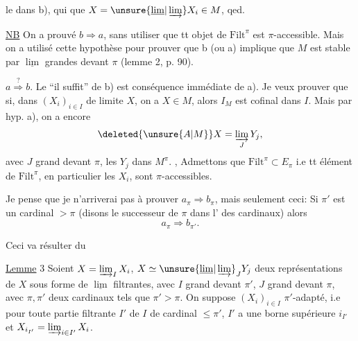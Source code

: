 le  dans b), qui   que $X=\unsure{\underline{\lim}|\varinjlim}X_i\in M$, qed.

\uline{NB} On a prouvé $b\Rightarrow a$, sans utiliser  que tt objet de $\mathrm{Filt}^{\pi}$ est $\pi$-accessible. Mais on a utilisé cette hypothèse pour prouver que b  (ou a) implique que $M$ est stable par $\underline{\lim}$ grandes devant $\pi$ (lemme 2, p. 90).

$a\overset{?}{\Longrightarrow}b$. Le ``il suffit'' de b) est conséquence immédiate de a). Je veux prouver que si, dans     $(X_i)_{i\in I}$ de limite $X$, on a $X\in M$, alors $I_M$ est cofinal dans $I$. Mais par hyp. a), on a encore
\[
\deleted{\unsure{A|M}}X=\varinjlim_JY_j,
\]
avec $J$ grand devant $\pi$, les $Y_j$ dans $M^{\pi}$. , Admettons que $\mathrm{Filt}^{\pi}\subset E_\pi$ i.e tt élément de $\mathrm{Filt}^{\pi}$, en particulier les $X_i$, sont  $\pi$-accessibles.

Je pense que je n'arriverai pas à prouver $a_\pi\Rightarrow b_\pi$, mais seulement ceci: Si $\pi'$ est un cardinal $>\pi$ (disons le successeur de $\pi$  dans l'  des cardinaux) alors
\[
a_\pi\Longrightarrow b_{\pi'}.
\]

Ceci va résulter du

\uline{Lemme} 3 Soient $X=\varinjlim_I X_i$, $X\simeq\unsure{\underline{\lim}|\varinjlim}_JY_j$ deux représentations de $X$ sous forme de $\underline{\lim}$ filtrantes, avec $I$ grand devant $\pi'$, $J$ grand devant $\pi$, avec $\pi,\pi'$ deux cardinaux tels que $\pi'>\pi$. On suppose $(X_i)_{i\in I}$ $\pi'$-adapté, i.e pour toute partie filtrante $I'$ de $I$ de cardinal $\leq\pi'$, $I'$ a une borne supérieure $i_{I'}$ et $X_{i_{I'}}=\varinjlim_{i\in I'}X_i$.

